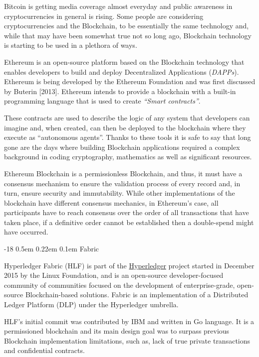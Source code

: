 \documentclass[]{llncs}
\makeatletter
\renewcommand\subsubsection{\@startsection{subsubsection}{3}{\z@}%
                       {-18\p@ \@plus -4\p@ \@minus -4\p@}%
                       {0.5em \@plus 0.22em \@minus 0.1em}%
                       {\normalfont\normalsize\bfseries\boldmath}}
\makeatother
\begin{document}
Bitcoin is getting media coverage almost everyday and public awareness in cryptocurrencies 
in general is rising. 
Some people are considering cryptocurrencies and the Blockchain, to be essentially the same 
technology and, while that may have been somewhat true not so long ago, Blockchain technology 
is starting to be used in a plethora of ways.

Ethereum is an open-source platform based on the Blockchain technology that enables developers 
to build and deploy Decentralized Applications (\textit{DAPPs}).
Ethereum is being developed by the Ethereum Foundation and was first discussed by Buterin [2013]. 
Ethereum intends to provide a blockchain with a built-in programming language that is used to 
create \textit{“Smart contracts”}.
\cite{Wood2017}

These contracts are used to describe the logic of any system that developers can imagine and, 
when created, can then be deployed to the blockchain where they execute as “autonomous agents”. 
Thanks to these tools it is safe to say that long gone are the days where building 
Blockchain applications required a complex background in coding cryptography, mathematics 
as well as significant resources.\cite{Wood2017,BlockGeeks2017}

Ethereum Blockchain is a permissionless Blockchain, and thus, it must have a consensus 
mechanism to ensure the validation process of every record and, in turn, ensure security 
and immutability. While other implementations of the blockchain have different consensus mechanics, 
in Ethereum’s case, all participants have to reach consensus over the order of all transactions 
that have taken place, if a definitive order cannot be established then a double-spend might have occurred.

\subsubsection{Fabric}

Hyperledger Fabric (HLF) is part of the \href{http://www.hyperledger.org/projects/fabric}{Hyperledger} 
project started in December 2015 by the Linux Foundation, and is an open-source developer-focused 
community of communities focused on the development of enterprise-grade, open-source Blockchain-based solutions. 
Fabric is an implementation of a Distributed Ledger Platform (DLP) under the Hyperledger umbrella.
\cite{Cachin2016}

HLF’s initial commit was contributed by IBM and written in Go language. 
It is a permissioned blockchain and its main design goal was to surpass previous 
Blockchain implementation limitations, such as, lack of true private transactions 
and confidential contracts.
\end{document}
